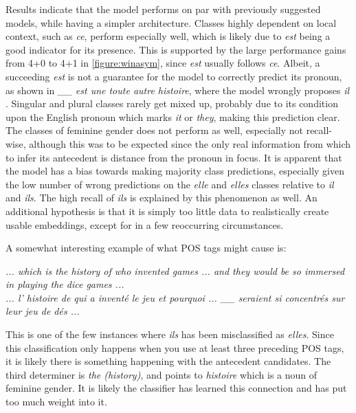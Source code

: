 \documentclass[11pt]{article}
\begin{document}
Results indicate that the model performs on par with previously suggested models, while having a simpler architecture.
Classes highly dependent on local context, such as \emph{ce}, perform especially well, which is likely due to \emph{est} being a good indicator for its presence.
This is supported by the large performance gains from 4+0 to 4+1 in \cref{figure:winasym}, since \emph{est} usually follows \emph{ce}.
Albeit, a succeeding \emph{est} is not a guarantee for the model to correctly predict its pronoun, as shown in \emph{\_\_ est une toute autre histoire}, where the model wrongly proposes \emph{il} .
Singular and plural classes rarely get mixed up, probably due to its condition upon the English pronoun which marks \emph{it} or \emph{they}, making this prediction clear.
The classes of feminine gender does not perform as well, especially not recall-wise, although this was to be expected since the only real information from which to infer its antecedent is distance from the pronoun in focus.
It is apparent that the model has a bias towards making majority class predictions, especially given the low number of wrong predictions on the \emph{elle} and \emph{elles} classes relative to \emph{il} and \emph{ils}.
The high recall of \emph{ils} is explained by this phenomenon as well.
An additional hypothesis is that it is simply too little data to realistically create usable embeddings, except for in a few reoccurring circumstances.

A somewhat interesting example of what POS tags might cause is:

\emph{... which is the history of who invented games ... and they would be so immersed in playing the dice games ...} \\
\emph{... l' histoire de qui a inventé le jeu et pourquoi ... \_\_ seraient si concentrés sur leur jeu de dés ...}

This is one of the few instances where \emph{ils} has been misclassified as \emph{elles}. Since this classification only happens when you use at least three preceding POS tags, it is likely there is something happening with the antecedent candidates. The third determiner is \emph{the (history)}, and points to \emph{histoire} which is a noun of feminine gender. It is likely the classifier has learned this connection and has put too much weight into it.
\end{document}
